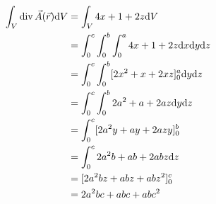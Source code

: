 \documentclass[sectionformat=aufgabe]{gadsescript}
\newcommand{\dd}{\text{d}}
\begin{document}
\begin{align*}
	\int _V \Div \vec A (\vec r) \dd V &= \int_{V}^{} 4x + 1 + 2z \dd V \\
	&= \int_{0}^{c} \int_{0}^{b} \int_{0}^{a} 4x + 1 + 2z \dd x \dd y \dd z \\
	&= \int_{0}^{c} \int_{0}^{b} [2x^2 + x + 2xz]_{0} ^{a} \dd y \dd z \\
	&= \int_{0}^{c} \int_{0}^{b} 2a^2 + a + 2az \dd y \dd z \\
	&= \int_{0}^{c} [2a^2 y + a y + 2az y]_{0} ^{b}  \\
	&= \int_{0}^{c} 2a^2b + ab + 2abz \dd z \\
	&= [2a^2bz + abz + abz^2]_{0} ^{c}  \\
	&= 2a^2bc + abc + abc^2
\end{align*}
\end{document}

